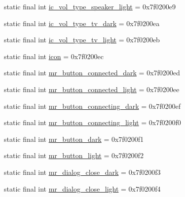 \begin{CompactItemize}
\item 
static final int \hyperlink{classandroid_1_1support_1_1graphics_1_1drawable_1_1_r_1_1drawable_47b19be64df28f46df5eed0de8b6a59e}{ic\_\-vol\_\-type\_\-speaker\_\-light} = 0x7f0200e9
\item 
static final int \hyperlink{classandroid_1_1support_1_1graphics_1_1drawable_1_1_r_1_1drawable_cb2286756a8e80772f03da5f2152eb10}{ic\_\-vol\_\-type\_\-tv\_\-dark} = 0x7f0200ea
\item 
static final int \hyperlink{classandroid_1_1support_1_1graphics_1_1drawable_1_1_r_1_1drawable_4537d0330dc078d71bb95ed0a1ea0143}{ic\_\-vol\_\-type\_\-tv\_\-light} = 0x7f0200eb
\item 
static final int \hyperlink{classandroid_1_1support_1_1graphics_1_1drawable_1_1_r_1_1drawable_7bd8e136e28cbe58b715fba6a96b22e5}{icon} = 0x7f0200ec
\item 
static final int \hyperlink{classandroid_1_1support_1_1graphics_1_1drawable_1_1_r_1_1drawable_ca0e440d8e402e7190d3c15f1dfac697}{mr\_\-button\_\-connected\_\-dark} = 0x7f0200ed
\item 
static final int \hyperlink{classandroid_1_1support_1_1graphics_1_1drawable_1_1_r_1_1drawable_db59c12de0446788e31a0f59eb8541a8}{mr\_\-button\_\-connected\_\-light} = 0x7f0200ee
\item 
static final int \hyperlink{classandroid_1_1support_1_1graphics_1_1drawable_1_1_r_1_1drawable_9385b532a57130977eaeab259b2e4a17}{mr\_\-button\_\-connecting\_\-dark} = 0x7f0200ef
\item 
static final int \hyperlink{classandroid_1_1support_1_1graphics_1_1drawable_1_1_r_1_1drawable_249f48b9fe63be15c3bf6ffb3019b25f}{mr\_\-button\_\-connecting\_\-light} = 0x7f0200f0
\item 
static final int \hyperlink{classandroid_1_1support_1_1graphics_1_1drawable_1_1_r_1_1drawable_7ec2fea3f6fd775c8d71cda1744a3567}{mr\_\-button\_\-dark} = 0x7f0200f1
\item 
static final int \hyperlink{classandroid_1_1support_1_1graphics_1_1drawable_1_1_r_1_1drawable_4cc58eec6693f9fe7dcf06b02092b8e3}{mr\_\-button\_\-light} = 0x7f0200f2
\item 
static final int \hyperlink{classandroid_1_1support_1_1graphics_1_1drawable_1_1_r_1_1drawable_c21482944e877fb6b6ffed1cbf991663}{mr\_\-dialog\_\-close\_\-dark} = 0x7f0200f3
\item 
static final int \hyperlink{classandroid_1_1support_1_1graphics_1_1drawable_1_1_r_1_1drawable_0ef5bf696a28b34efef9507b04de60a3}{mr\_\-dialog\_\-close\_\-light} = 0x7f0200f4

\end{CompactItemize}
